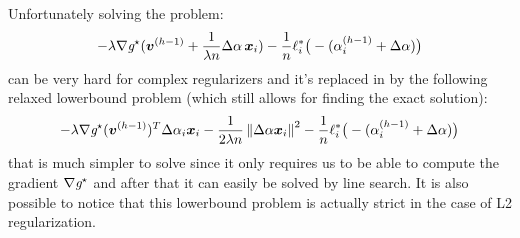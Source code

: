 Unfortunately solving the problem:
$$\schardproblem$$
can be very hard for complex regularizers and it's replaced in \cite{ShalevShwartz:2012tn} by the following relaxed
lowerbound problem (which still allows for finding the exact solution):
$$\screlaxedproblem$$
that is much simpler to solve since it only requires us to be able to compute the gradient $\nabla \dualreg$ and after
that it can easily be solved by line search. It is also possible to notice that this lowerbound problem is actually
strict in the case of L2 regularization.
